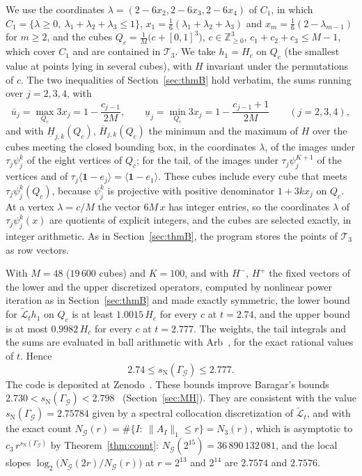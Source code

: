 \documentclass[11pt]{amsart}
\theoremstyle{definition}
\theoremstyle{remark}
\newcommand{\one}{\mathbf 1}
\newcommand{\Z}{\mathbb Z}
\newcommand{\cT}{\mathcal T}
\newcommand{\cG}{\mathcal G}
\newcommand{\GG}{\Gamma_{\mathcal G}}
\newcommand{\sN}{s_{\mathrm N}}
\newcommand{\pr}[1]{\langle #1\rangle}
\begin{document}
We use the coordinates $\lambda=(2-6x_2,2-6x_3,2-6x_4)$ of $C_1$, in which $C_1=\{\lambda\ge0,\ \lambda_1+\lambda_2+\lambda_3\le1\}$, $x_1=\frac16(\lambda_1+\lambda_2+\lambda_3)$ and $x_m=\frac16(2-\lambda_{m-1})$ for $m\ge2$, and the cubes $Q_c=\frac1M\bigl(c+[0,1]^3\bigr)$, $c\in\Z^3_{\ge0}$, $c_1+c_2+c_3\le M-1$, which cover $C_1$ and are contained in $\cT_3$. We take $h_1=H_c$ on $Q_c$ (the smallest value at points lying in several cubes), with $H$ invariant under the permutations of $c$. The two inequalities of Section~\ref{sec:thmB} hold verbatim, the sums running over $j=2,3,4$, with
\[
  \bar u_j=\max_{Q_c}3x_j=1-\frac{c_{j-1}}{2M},\qquad \underline u_j=\min_{Q_c}3x_j=1-\frac{c_{j-1}+1}{2M}\qquad(j=2,3,4),
\]
and with $\underline H_{j,k}(Q_c)$, $\overline H_{j,k}(Q_c)$ the minimum and the maximum of $H$ over the cubes meeting the closed bounding box, in the coordinates $\lambda$, of the images under $\tau_j\psi_j^k$ of the eight vertices of $Q_c$; for the tail, of the images under $\tau_j\psi_j^{K+1}$ of the vertices and of $\tau_j\pr{\one-e_j}=\pr{\one-e_1}$. These cubes include every cube that meets $\tau_j\psi_j^k(Q_c)$, because $\psi_j^k$ is projective with positive denominator $1+3kx_j$ on $Q_c$. At a vertex $\lambda=c/M$ the vector $6M\,x$ has integer entries, so the coordinates $\lambda$ of $\tau_j\psi_j^k(x)$ are quotients of explicit integers, and the cubes are selected exactly, in integer arithmetic. As in Section~\ref{sec:thmB}, the program stores the points of $\cT_3$ as row vectors.

With $M=48$ ($19\,600$ cubes) and $K=100$, and with $H^-$, $H^+$ the fixed vectors of the lower and the upper discretized operators, computed by nonlinear power iteration as in Section~\ref{sec:thmB} and made exactly symmetric, the lower bound for $\tilde{\mathcal L}_th_1$ on $Q_c$ is at least $1.0015\,H_c$ for every $c$ at $t=2.74$, and the upper bound is at most $0.9982\,H_c$ for every $c$ at $t=2.777$. The weights, the tail integrals and the sums are evaluated in ball arithmetic with Arb~\cite{Arb}, for the exact rational values of $t$. Hence
\[
  2.74\le\sN(\GG)\le2.777 .
\]
The code is deposited at Zenodo~\cite{DLdata}. These bounds improve Baragar's bounds $2.730<\sN(\GG)<2.798$~\cite[Thm.~0.1]{Bar98} (Section~\ref{sec:MH}). They are consistent with the value $\sN(\GG)=2.75784$ given by a spectral collocation discretization of $\tilde{\mathcal L}_t$, and with the exact count $N_\cG(r)=\#\{I:\ \|A_I\|_1\le r\}=N_3(r)$, which is asymptotic to $c_3\,r^{\sN(\GG)}$ by Theorem~\ref{thm:count}: $N_\cG(2^{15})=36\,890\,132\,081$, and the local slopes $\log_2\bigl(N_\cG(2r)/N_\cG(r)\bigr)$ at $r=2^{13}$ and $2^{14}$ are $2.7574$ and $2.7576$.
\end{document}
